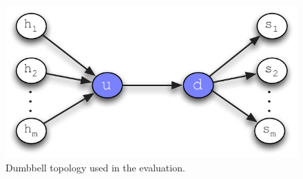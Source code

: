 %




\begin{figure}
  \centering
   \includegraphics[scale=0.75]{figs/pcount-setup.pdf}
\caption{Dumbbell topology used in the \pcnt evaluation.}
\label{fig:eval-pcount-setup}
\end{figure}

